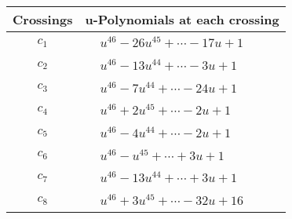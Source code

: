 \documentclass[1p]{elsarticle_modified}
\theoremstyle{definition}
\begin{document}
\begin{tabular}{m{50pt}|m{274pt}}
Crossings & \hspace{64pt}u-Polynomials at each crossing \\
\hline $$\begin{aligned}c_{1}\end{aligned}$$&$\begin{aligned}
&u^{46}-26 u^{45}+\cdots-17 u+1
\end{aligned}$\\
\hline $$\begin{aligned}c_{2}\end{aligned}$$&$\begin{aligned}
&u^{46}-13 u^{44}+\cdots-3 u+1
\end{aligned}$\\
\hline $$\begin{aligned}c_{3}\end{aligned}$$&$\begin{aligned}
&u^{46}-7 u^{44}+\cdots-24 u+1
\end{aligned}$\\
\hline $$\begin{aligned}c_{4}\end{aligned}$$&$\begin{aligned}
&u^{46}+2 u^{45}+\cdots-2 u+1
\end{aligned}$\\
\hline $$\begin{aligned}c_{5}\end{aligned}$$&$\begin{aligned}
&u^{46}-4 u^{44}+\cdots-2 u+1
\end{aligned}$\\
\hline $$\begin{aligned}c_{6}\end{aligned}$$&$\begin{aligned}
&u^{46}- u^{45}+\cdots+3 u+1
\end{aligned}$\\
\hline $$\begin{aligned}c_{7}\end{aligned}$$&$\begin{aligned}
&u^{46}-13 u^{44}+\cdots+3 u+1
\end{aligned}$\\
\hline $$\begin{aligned}c_{8}\end{aligned}$$&$\begin{aligned}
&u^{46}+3 u^{45}+\cdots-32 u+16
\end{aligned}$\\

\end{tabular}
\end{document}
